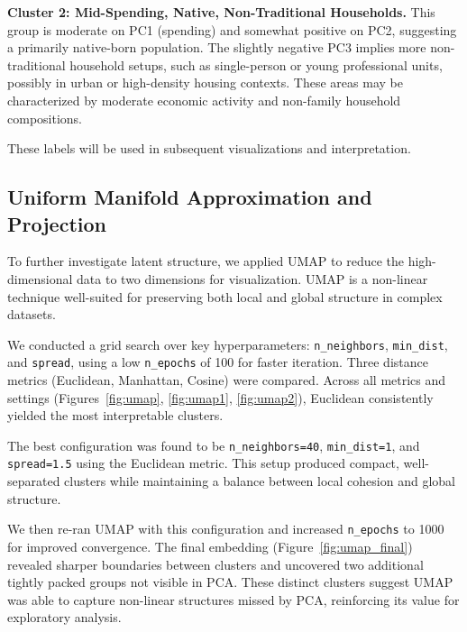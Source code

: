 \documentclass{article}
\begin{document}
\textbf{Cluster 2: Mid-Spending, Native, Non-Traditional Households.}  
This group is moderate on PC1 (spending) and somewhat positive on PC2, suggesting a primarily native-born population. The slightly negative PC3 implies more non-traditional household setups, such as single-person or young professional units, possibly in urban or high-density housing contexts. These areas may be characterized by moderate economic activity and non-family household compositions.

These labels will be used in subsequent visualizations and interpretation.

\subsection{Uniform Manifold Approximation and Projection}

To further investigate latent structure, we applied UMAP to reduce the high-dimensional data to two dimensions for visualization. UMAP is a non-linear technique well-suited for preserving both local and global structure in complex datasets.

We conducted a grid search over key hyperparameters: \texttt{n\_neighbors}, \texttt{min\_dist}, and \texttt{spread}, using a low \texttt{n\_epochs} of 100 for faster iteration. Three distance metrics (Euclidean, Manhattan, Cosine) were compared. Across all metrics and settings (Figures~\ref{fig:umap}, \ref{fig:umap1}, \ref{fig:umap2}), Euclidean consistently yielded the most interpretable clusters.

The best configuration was found to be \texttt{n\_neighbors=40}, \texttt{min\_dist=1}, and \texttt{spread=1.5} using the Euclidean metric. This setup produced compact, well-separated clusters while maintaining a balance between local cohesion and global structure.

We then re-ran UMAP with this configuration and increased \texttt{n\_epochs} to 1000 for improved convergence. The final embedding (Figure~\ref{fig:umap_final}) revealed sharper boundaries between clusters and uncovered two additional tightly packed groups not visible in PCA. These distinct clusters suggest UMAP was able to capture non-linear structures missed by PCA, reinforcing its value for exploratory analysis.
\end{document}
